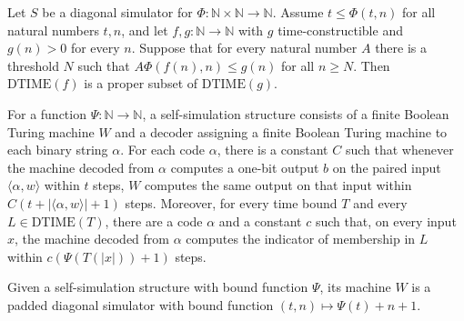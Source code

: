 \begin{theorem}
\label{Complexity.TimeHierarchy.DiagSimulator.time_hierarchy_of_pos}
\leanok
{}
Let $S$ be a diagonal simulator for $\Phi:\mathbb{N}\times\mathbb{N}\to\mathbb{N}$.
Assume $t\le\Phi(t,n)$ for all natural numbers $t,n$, and let
$f,g:\mathbb{N}\to\mathbb{N}$ with $g$ time-constructible and $g(n)>0$ for every $n$.
Suppose that for every natural number $A$ there is a threshold $N$ such that
$A\Phi(f(n),n)\le g(n)$ for all $n\ge N$. Then $\mathrm{DTIME}(f)$ is a proper subset of
$\mathrm{DTIME}(g)$.
\end{theorem}

\begin{definition}
\label{Complexity.TimeHierarchy.SelfSimulator}
\leanok
{}
For a function $\Psi : \mathbb{N} \to \mathbb{N}$, a self-simulation structure consists
of a finite Boolean Turing machine $W$ and a decoder assigning a finite Boolean Turing
machine to each binary string $\alpha$. For each code $\alpha$, there is a constant $C$
such that whenever the machine decoded from $\alpha$ computes a one-bit output $b$ on
the paired input $\langle\alpha,w\rangle$ within $t$ steps, $W$ computes the same output
on that input within $C(t+|\langle\alpha,w\rangle|+1)$ steps. Moreover, for every time
bound $T$ and every $L \in \mathrm{DTIME}(T)$, there are a code $\alpha$ and a constant
$c$ such that, on every input $x$, the machine decoded from $\alpha$ computes the
indicator of membership in $L$ within $c(\Psi(T(|x|))+1)$ steps.
\end{definition}

\begin{definition}
\label{Complexity.TimeHierarchy.SelfSimulator.toDiagSimulator}
\leanok
{}
Given a self-simulation structure with bound function $\Psi$, its machine $W$ is a
padded diagonal simulator with bound function $(t,n) \mapsto \Psi(t)+n+1$.
\end{definition}

